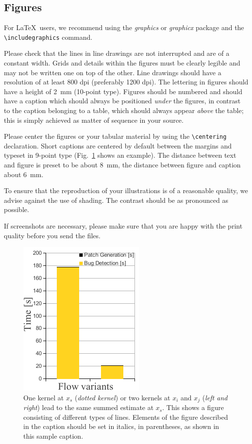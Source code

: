 \documentclass[runningheads,a4paper]{llncs}
\begin{document}
\subsection{Figures}

For \LaTeX\ users, we recommend using the \emph{graphics} or \emph{graphicx}
package and the \verb+\includegraphics+ command.

Please check that the lines in line drawings are not
interrupted and are of a constant width. Grids and details within the
figures must be clearly legible and may not be written one on top of
the other. Line drawings should have a resolution of at least 800 dpi
(preferably 1200 dpi). The lettering in figures should have a height of
2~mm (10-point type). Figures should be numbered and should have a
caption which should always be positioned \emph{under} the figures, in
contrast to the caption belonging to a table, which should always appear
\emph{above} the table; this is simply achieved as matter of sequence in
your source.

Please center the figures or your tabular material by using the \verb+\centering+
declaration. Short captions are centered by default between the margins
and typeset in 9-point type (Fig.~\ref{fig:example} shows an example).
The distance between text and figure is preset to be about 8~mm, the
distance between figure and caption about 6~mm.

To ensure that the reproduction of your illustrations is of a reasonable
quality, we advise against the use of shading. The contrast should be as
pronounced as possible.

If screenshots are necessary, please make sure that you are happy with
the print quality before you send the files.
\begin{figure}
\centering
\includegraphics[trim=0.0cm 0.0cm 0.0cm 0.0cm, scale=0.9]{fig3.pdf}
\caption{One kernel at $x_s$ (\emph{dotted kernel}) or two kernels at
$x_i$ and $x_j$ (\textit{left and right}) lead to the same summed estimate
at $x_s$. This shows a figure consisting of different types of
lines. Elements of the figure described in the caption should be set in
italics, in parentheses, as shown in this sample caption.}
\label{fig:example}
\end{figure}
\end{document}
